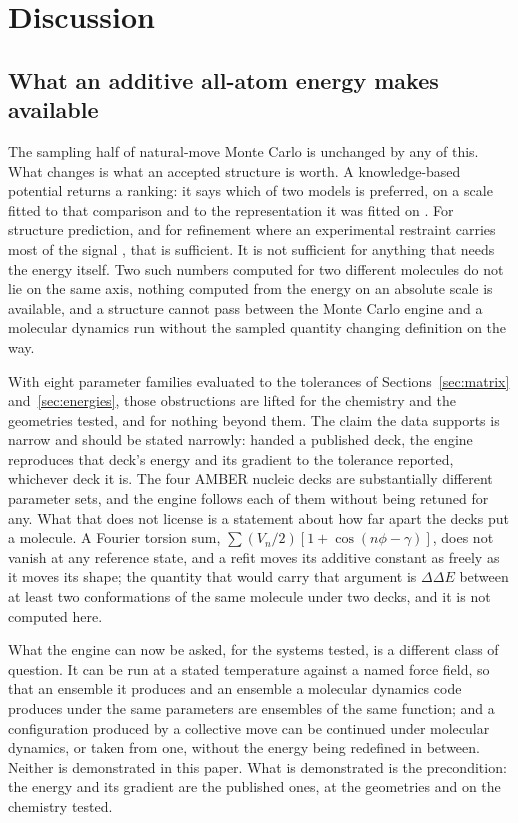 \section{Discussion}
\label{sec:discussion}

\subsection{What an additive all-atom energy makes available}
\label{sec:whatchanges}

The sampling half of natural-move Monte Carlo is unchanged by any of this. What
changes is what an accepted structure is worth. A knowledge-based potential
returns a ranking: it says which of two models is preferred, on a scale fitted
to that comparison and to the representation it was fitted on
\cite{minary2008foldspace,leaverfay2011rosetta}. For structure prediction, and
for refinement where an experimental restraint carries most of the signal
\cite{zhang2012multiscale,chang2020rnacryoem}, that is sufficient. It is not
sufficient for anything that needs the energy itself. Two such numbers computed
for two different molecules do not lie on the same axis, nothing computed from
the energy on an absolute scale is available, and a structure cannot pass
between the Monte Carlo engine and a molecular dynamics run without the sampled
quantity changing definition on the way.

With eight parameter families evaluated to the tolerances of
Sections~\ref{sec:matrix} and~\ref{sec:energies}, those obstructions are lifted
for the chemistry and the geometries tested, and for nothing beyond them. The
claim the data supports is narrow and should be stated narrowly: handed a
published deck, the engine reproduces that deck's energy and its gradient to
the tolerance reported, whichever deck it is. The four AMBER nucleic decks are
substantially different parameter sets, and the engine follows each of them
without being retuned for any. What that does not license is a statement about
how far apart the decks put a molecule. A Fourier torsion sum, $\sum
(V_n/2)[1+\cos(n\phi-\gamma)]$, does not vanish at any reference state, and a
refit moves its additive constant as freely as it moves its shape; the
quantity that would carry that argument is $\Delta\Delta E$ between at least
two conformations of the same molecule under two decks, and it is not computed
here.

What the engine can now be asked, for the systems tested, is a different class
of question. It can be run at a stated temperature against a named force field,
so that an ensemble it produces and an ensemble a molecular dynamics code
produces under the same parameters are ensembles of the same function; and a
configuration produced by a collective move can be continued under molecular
dynamics, or taken from one, without the energy being redefined in between.
Neither is demonstrated in this paper. What is demonstrated is the
precondition: the energy and its gradient are the published ones, at the
geometries and on the chemistry tested.

